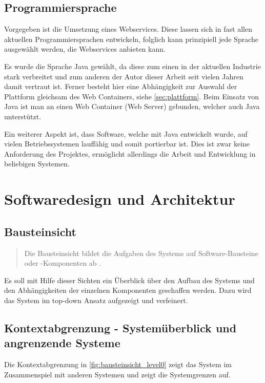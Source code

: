 \subsection{Programmiersprache}
Vorgegeben ist die Umsetzung eines \glspl{Webservice}. Diese lassen sich in fast allen aktuellen Programmiersprachen entwickeln, folglich kann prinzipiell jede Sprache ausgewählt werden, die Webservices anbieten kann.  

Es wurde die Sprache Java gewählt, da diese zum einen in der aktuellen Industrie stark verbreitet und zum anderen der Autor dieser Arbeit seit vielen Jahren damit vertraut ist. Ferner besteht hier eine Abhängigkeit zur Auswahl der Plattform gleichsam des Web Containers, siehe \autoref{sec:plattform}. Beim Einsatz von Java ist man an einen Web Container (Web Server) gebunden, welcher auch Java unterstützt. 

Ein weiterer Aspekt ist, dass Software, welche mit Java entwickelt wurde, auf vielen Betriebssystemen lauffähig und somit portierbar ist. Dies ist zwar keine Anforderung des Projektes, ermöglicht allerdings die Arbeit und Entwicklung in beliebigen Systemen. 

\section{Softwaredesign und Architektur}

\subsection{Bausteinsicht}
\begin{quotation}
Die Bausteinsicht bildet die Aufgaben des Systems auf Software-Bausteine oder -Komponenten ab
 \citep[S. 98ff][]{starke}.	
\end{quotation}

Es soll mit Hilfe dieser Sichten ein Überblick über den Aufbau des Systems und den Abhängigkeiten der einzelnen Komponenten geschaffen werden. Dazu wird das System im top-down Ansatz aufgezeigt und verfeinert. 

\subsection{Kontextabgrenzung - Systemüberblick und angrenzende Systeme}

Die Kontextabgrenzung in \autoref{fig:bausteinsicht_level0} zeigt das System im Zusammenspiel mit anderen Systemen und zeigt die Systemgrenzen auf. 

